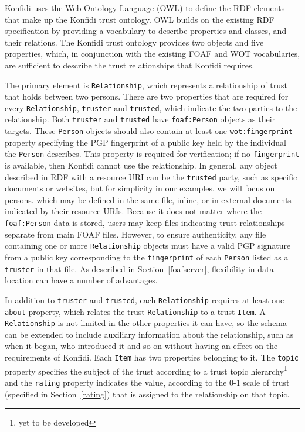 \documentclass[letterpaper]{www2006-submission}
\begin{document}
Konfidi uses the Web Ontology Language (OWL) \citep{owl} to define the RDF elements that make up the Konfidi trust ontology.  OWL builds on the existing RDF specification by providing a vocabulary to describe properties and classes, and their relations.  The Konfidi trust ontology provides two objects and five properties, which, in conjunction with the existing FOAF and WOT vocabularies, are sufficient to describe the trust relationships that Konfidi requires.

The primary element is \texttt{Re\-la\-tion\-ship}, which represents a relationship of trust that holds between two persons.  There are two properties that are required for every \texttt{Re\-la\-tion\-ship}, \texttt{trust\-er} and \texttt{trust\-ed}, which indicate the two parties to the relationship.  Both \texttt{trust\-er} and \texttt{trust\-ed} have \texttt{foaf:\-Per\-son} objects as their targets.  These \texttt{Per\-son} objects should also contain at least one \texttt{wot:\-fin\-ger\-print} property specifying the PGP fingerprint of a public key held by the individual the \texttt{Per\-son} describes.  This property is required for verification; if no \texttt{fin\-ger\-print} is available, then Konfidi cannot use the relationship.  In general, any object described in RDF with a resource URI can be the \texttt{trust\-ed} party, such as specific documents or websites, but for simplicity in our examples, we will focus on persons. which may be defined in the same file, inline, or in external documents indicated by their resource URIs.  Because it does not matter where the \texttt{foaf:\-Per\-son} data is stored, users may keep files indicating trust relationships separate from main FOAF files.  However, to ensure authenticity, any file containing one or more \texttt{Re\-la\-tion\-ship} objects must have a valid PGP signature from a public key corresponding to the \texttt{fin\-ger\-print} of each \texttt{Per\-son} listed as a \texttt{trust\-er} in that file.  As described in Section~\ref{foafserver}, flexibility in data location can have a number of advantages.  

In addition to \texttt{truster} and \texttt{trusted}, each \texttt{Relationship} requires at least one \texttt{about} property, which relates the trust \texttt{Re\-la\-tion\-ship} to a trust \texttt{Item}.  A \texttt{Re\-la\-tion\-ship} is not limited in the other properties it can have, so the schema can be extended to include auxiliary information about the relationship, such as when it began, who introduced it and so on without having an effect on the requirements of Konfidi.  Each \texttt{Item} has two properties belonging to it.  The \texttt{topic} property specifies the subject of the trust according to a trust topic hierarchy\footnote{yet to be developed} and the \texttt{rating} property indicates the value, according to the 0-1 scale of trust (specified in Section~\ref{rating}) that is assigned to the relationship on that topic.  
\end{document}
